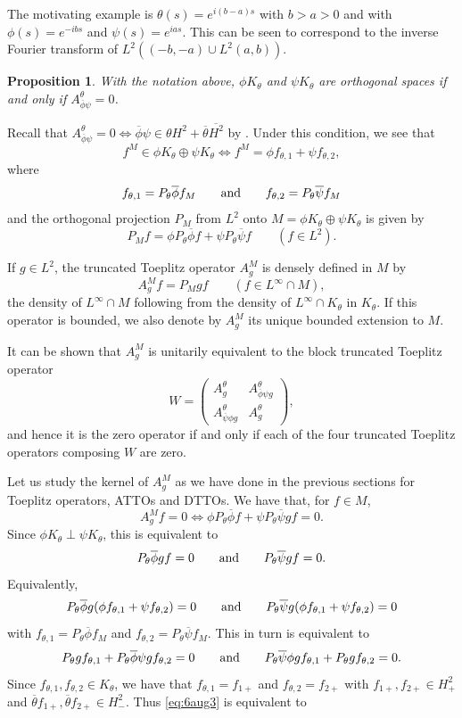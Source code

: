 \documentclass[11pt]{article}
\newtheorem{prop}[thm]{Proposition}
\def\beq{\begin{equation}}
\def\eeq{\end{equation}}
\def\ol{\overline}
\begin{document}
The motivating example is $\theta(s)=e^{i(b-a)s}$ with $b>a>0$ and with
$\phi(s)=e^{-ibs}$ and $\psi(s)=e^{ias}$. This can be seen to correspond to the inverse Fourier transform
of $L^2((-b,-a) \cup L^2(a,b))$.

\begin{prop}\cite[Prop.~2.1]{COP22}
With the notation above, $\phi K_\theta$ and $\psi K_\theta$ are orthogonal spaces if and only if $A^\theta_{\ol\phi\psi}=0$.
\end{prop}

Recall that $A^\theta_{\ol\phi\psi}=0 \iff \ol\phi\psi \in \theta H^2 + \ol\theta \ol{H^2}$
by \cite[Thm.~3.1]{sarason07}. Under this condition, we see that 
\[
f^M \in \phi K_\theta \oplus \psi K_\theta \iff f^M = \phi f_{\theta,1} + \psi f_{\theta,2},
\]
where 
\[
 f_{\theta,1} = P_\theta \ol\phi f_M \qquad \hbox{and} \qquad 
 f_{\theta,2} = P_\theta \ol \psi f_M
 \]
 and the orthogonal projection $P_M$ from $L^2$ onto $M=\phi K_\theta \oplus \psi K_\theta$ is given by
 \[
 P_M f = \phi P_\theta \ol \phi f + \psi P_\theta \ol \psi f  \qquad (f \in L^2).
 \]
 

 
 If $g \in L^2$, the truncated Toeplitz operator $A^M_g$ is densely defined in $M$ by
 \[
 A_g^M f = P_M gf \qquad (f \in L^\infty \cap M),
 \]
 the density of $L^\infty \cap M$ following from the density
 of $L^\infty \cap K_\theta$ in $K_\theta$. 
 If this operator is bounded, we
 also denote by $A^M_g$ its unique bounded extension to $M$.
 

 

It can be shown that $A^M_g$ is unitarily equivalent to the block truncated Toeplitz operator
\[
W = \begin{pmatrix}
A^\theta_g & A^\theta_{\ol\phi \psi g} \\
A^\theta_{\ol\psi \phi g} & A^\theta_g
\end{pmatrix},
\]
and hence it is the zero operator if and only if each of the four truncated Toeplitz operators
composing $W$ are zero.

 Let us study the kernel of $A^M_g$ as we have done in the previous
 sections for Toeplitz operators, ATTOs and DTTOs. We have that, for $f \in M$,
 \[
 A^M_g f =0 \iff \phi P_\theta \ol\phi f + \psi P_\theta \ol\psi g f=0.
 \]
 Since $\phi K_\theta \perp \psi K_\theta$, this is equivalent to
 \[
 P_\theta \ol\phi gf=0 \qquad \hbox{and} \qquad P_\theta \ol\psi gf=0.
 \]
 Equivalently,
\[
 P_\theta \ol\phi g (\phi f_{\theta,1}+ \psi f_{\theta,2}) =0  \qquad\hbox{and} \qquad
 P_\theta \ol\psi g(\phi f_{\theta,1}+ \psi f_{\theta,2}) =0
\]
 with $f_{\theta,1}=P_\theta\ol\phi f_M$ and $f_{\theta,2}=P_\theta\ol\psi f_M$.
 This in turn is equivalent to
 \beq\label{eq:6aug3}
 P_\theta g f_{\theta,1}+ P_\theta \ol\phi \psi g f_{\theta,2}=0
 \qquad \hbox{and} \qquad
 P_\theta \ol\psi \phi g f_{\theta,1} + P_\theta g  f_{\theta,2}=0.
 \eeq
 Since $f_{\theta,1},f_{\theta,2} \in K_\theta$, we have that
 $f_{\theta,1} = f_{1+}$ and $f_{\theta,2}=f_{2+}$ with $f_{1+},f_{2+} \in H^2_+$ and 
 $\ol\theta f_{1+},\ol\theta f_{2+} \in H^2_-$.
 Thus \eqref{eq:6aug3} is equivalent to 
 
\end{document}
